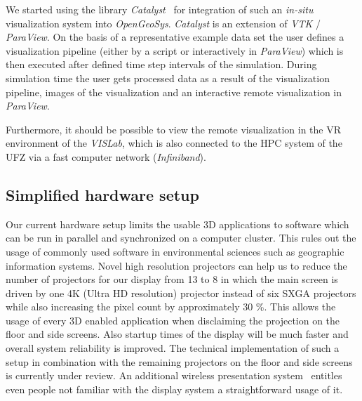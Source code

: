 \documentclass[twocolumn]{svjour3}          %
\begin{document}
We started using the library \emph{Catalyst}~\cite{web:catalyst} for integration of such an \emph{in-situ} visualization system into \emph{OpenGeoSys}. \emph{Catalyst} is an extension of \emph{VTK} / \emph{ParaView}. On the basis of a representative example data set the user defines a visualization pipeline (either by a script or interactively in \emph{ParaView}) which is then executed after defined time step intervals of the simulation. During simulation time the user gets processed data as a result of the visualization pipeline, images of the visualization and an interactive remote visualization in \emph{ParaView}.

Furthermore, it should be possible to view the remote visualization in the VR environment of the \emph{VISLab}, which is also connected to the HPC system of the UFZ via a fast computer network (\emph{Infiniband}).

\subsection{Simplified hardware setup}
\label{simplified-hardware-setup}

Our current hardware setup limits the usable 3D applications to software which can be run in parallel and synchronized on a computer cluster. This rules out the usage of commonly used software in environmental sciences such as geographic information systems. Novel high resolution projectors can help us to reduce the number of projectors for our display from 13 to 8 in which the main screen is driven by one 4K (Ultra HD resolution) projector instead of six SXGA projectors while also increasing the pixel count by approximately 30 \%. This allows the usage of every 3D enabled application when disclaiming the projection on the floor and side screens. Also startup times of the display will be much faster and overall system reliability is improved. The technical implementation of such a setup in combination with the remaining projectors on the floor and side screens is currently under review. An additional wireless presentation system~\cite{web:clickshare} entitles even people not familiar with the display system a straightforward usage of it.

\end{document}
